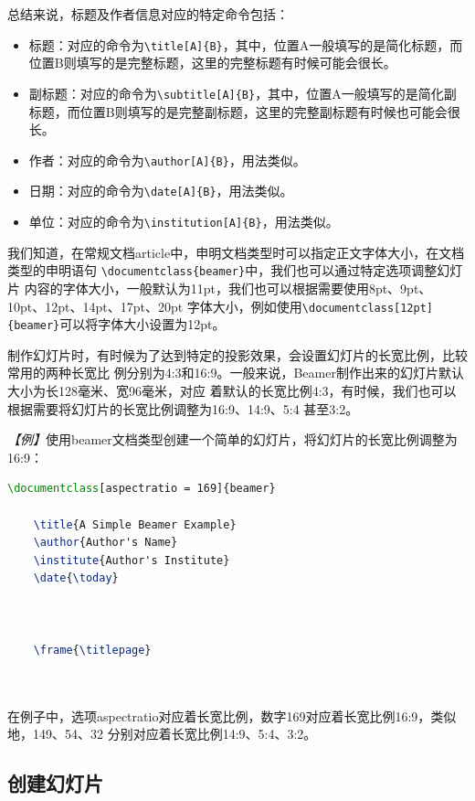 总结来说，标题及作者信息对应的特定命令包括：
\begin{itemize}
    \item 标题：对应的命令为\texttt{\textbackslash{}title[A]\{B\}}，其中，位置A一般填写的是简化标题，而位置B则填写的是完整标题，这里的完整标题有时候可能会很长。
    \item 副标题：对应的命令为\texttt{\textbackslash{}subtitle[A]\{B\}}，其中，位置A一般填写的是简化副标题，而位置B则填写的是完整副标题，这里的完整副标题有时候也可能会很长。
    \item 作者：对应的命令为\texttt{\textbackslash{}author[A]\{B\}}，用法类似。
    \item 日期：对应的命令为\texttt{\textbackslash{}date[A]\{B\}}，用法类似。
    \item 单位：对应的命令为\texttt{\textbackslash{}institution[A]\{B\}}，用法类似。
\end{itemize}

我们知道，在常规文档article中，申明文档类型时可以指定正文字体大小，在文档类型的申明语句
\texttt{\textbackslash{}documentclass\{beamer\}}中，我们也可以通过特定选项调整幻灯片
内容的字体大小，一般默认为11pt，我们也可以根据需要使用8pt、9pt、10pt、12pt、14pt、17pt、20pt
字体大小，例如使用\texttt{\textbackslash{}documentclass[12pt]\{beamer\}}可以将字体大小设置为12pt。

制作幻灯片时，有时候为了达到特定的投影效果，会设置幻灯片的长宽比例，比较常用的两种长宽比
例分别为4:3和16:9。一般来说，Beamer制作出来的幻灯片默认大小为长128毫米、宽96毫米，对应
着默认的长宽比例4:3，有时候，我们也可以根据需要将幻灯片的长宽比例调整为16:9、14:9、5:4
甚至3:2。

\emph{【例】}使用beamer文档类型创建一个简单的幻灯片，将幻灯片的长宽比例调整为16:9：
\begin{lstlisting}[language=TeX]
    \documentclass[aspectratio = 169]{beamer}

    \title{A Simple Beamer Example}
    \author{Author's Name}
    \institute{Author's Institute}
    \date{\today} 

    

    \frame{\titlepage}

    
\end{lstlisting}

在例子中，选项aspectratio对应着长宽比例，数字169对应着长宽比例16:9，类似地，149、54、32
分别对应着长宽比例14:9、5:4、3:2。

\subsection{创建幻灯片}

